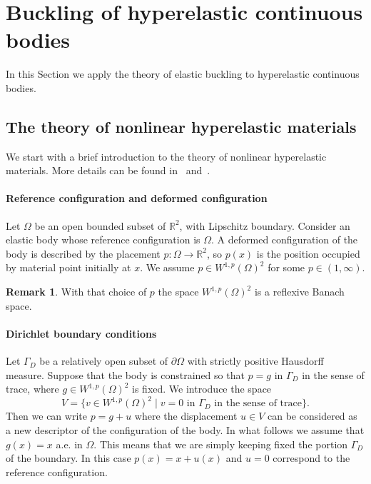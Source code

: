\documentclass[a4paper,11pt]{article}
\theoremstyle{definition}
\newtheorem{rmk}[prop]{Remark}
\begin{document}
\section{Buckling of hyperelastic continuous bodies}
\label{sec:body}

In this Section we apply the theory of elastic buckling to hyperelastic continuous bodies.

\subsection{The theory of nonlinear hyperelastic materials}

We start with a brief introduction to the theory of nonlinear hyperelastic materials. More details can be found in~\cite{gurtin-anand-fried} and~\cite{ball-convexity}.

\paragraph{Reference configuration and deformed configuration} Let $\Omega$ be an open bounded subset of $\mathbb{R}^2$, with Lipschitz boundary. Consider an elastic body whose reference configuration is $\Omega$. A deformed configuration of the body is described by the placement $p\colon\Omega\to\mathbb{R}^2$, so $p(x)$ is the position occupied by material point initially at $x$. We assume $p\in W^{1,p}(\Omega)^2$ for some $p\in(1,\infty)$.

\begin{rmk}
With that choice of $p$ the space $W^{1,p}(\Omega)^2$ is a reflexive Banach space.
\end{rmk}

\paragraph{Dirichlet boundary conditions} Let $\Gamma_D$ be a relatively open subset of $\partial\Omega$ with strictly positive Hausdorff measure. Suppose that the body is constrained so that $p=g$ in $\Gamma_D$ in the sense of trace, where $g\in W^{1,p}(\Omega)^2$ is fixed. We introduce the space
\[
V=\{v\in W^{1,p}(\Omega)^2\;|\;\text{$v=0$ in $\Gamma_D$ in the sense of trace}\}.
\]
Then we can write $p=g+u$ where the displacement $u\in V$ can be considered as a new descriptor of the configuration of the body. In what follows we assume that $g(x)=x$ a.e. in $\Omega$. This means that we are simply keeping fixed the portion $\Gamma_D$ of the boundary. In this case $p(x)=x+u(x)$ and $u=0$ correspond to the reference configuration.
\end{document}

